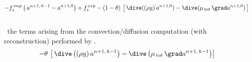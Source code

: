 \begin{equation}\notag
 -f_s^{\,imp} \left(\,a^{n+1,\,k-1} - a^{n+1,0}\right) + f_s^{\,exp}- (1-\theta)\,\left[\,\dive((\rho \underline{u})\,a^{n+1,0}) - \dive(\mu_{\,tot}\,\grad a^{n+1,0})\,\right]\\
\end{equation}
\\
\hspace*{1cm}{\tiny$\blacksquare$}\ the terms arising from the
convection/diffusion computation (with reconstruction) performed by .\\
\begin{equation}\notag
- \theta\,\left[\,\dive\left((\rho \underline{u})\,a^{n+1,\,k-1}\right)- \dive\left(\mu_{\,tot}\,\grad a^{n+1,\,k-1}\right)\right]
\end{equation}

